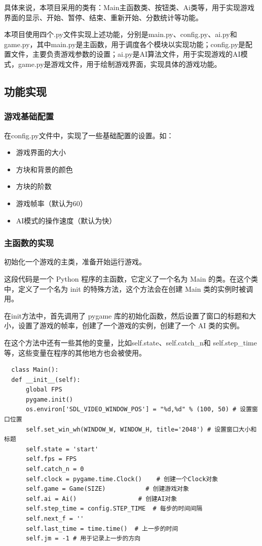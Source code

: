 \documentclass[UTF8,AutoFakeBold,AutoFakeSlant,zihao=-4]{ctexart}
\begin{document}
具体来说，本项目采用的类有：Main主函数类、按钮类、Ai类等，用于实现游戏界面的显示、开始、暂停、结束、重新开始、分数统计等功能。

本项目使用四个.py文件实现上述功能，分别是main.py、config.py、ai.py和game.py，其中main.py是主函数，用于调度各个模块以实现功能；config.py是配置文件，主要负责游戏参数的设置；ai.py是AI算法文件，用于实现游戏的AI模式，game.py是游戏文件，用于绘制游戏界面，实现具体的游戏功能。

\subsection{功能实现}

\subsubsection{游戏基础配置}

在config.py文件中，实现了一些基础配置的设置。如：

\begin{itemize}
  \item 游戏界面的大小
  \item 方块和背景的颜色
  \item 方块的阶数
  \item 游戏帧率（默认为60）
  \item AI模式的操作速度（默认为快）
\end{itemize}


\subsubsection{主函数的实现}

初始化一个游戏的主类，准备开始运行游戏。

这段代码是一个 Python 程序的主函数，它定义了一个名为 Main 的类。在这个类中，定义了一个名为 init 的特殊方法，这个方法会在创建 Main 类的实例时被调用。

在init方法中，首先调用了 pygame 库的初始化函数，然后设置了窗口的标题和大小，设置了游戏的帧率，创建了一个游戏的实例，创建了一个 AI 类的实例。

在这个方法中还有一些其他的变量，比如self.state、self.catch\_n和 self.step\_time等，这些变量在程序的其他地方也会被使用。
\begin{lstlisting}
  class Main():
  def __init__(self):
      global FPS
      pygame.init()
      os.environ['SDL_VIDEO_WINDOW_POS'] = "%d,%d" % (100, 50) # 设置窗口位置
      self.set_win_wh(WINDOW_W, WINDOW_H, title='2048') # 设置窗口大小和标题
      self.state = 'start'
      self.fps = FPS
      self.catch_n = 0
      self.clock = pygame.time.Clock()    # 创建一个Clock对象
      self.game = Game(SIZE)           # 创建游戏对象
      self.ai = Ai()                 # 创建AI对象
      self.step_time = config.STEP_TIME  # 每步的时间间隔
      self.next_f = ''
      self.last_time = time.time()  # 上一步的时间
      self.jm = -1 # 用于记录上一步的方向
  \end{lstlisting}
\end{document}
